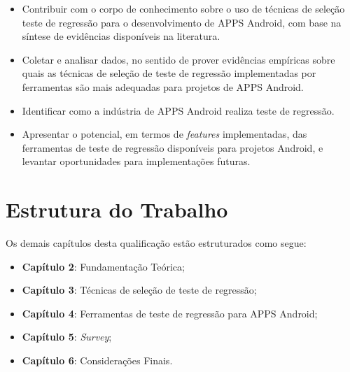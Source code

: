 \begin{itemize}

    \item Contribuir com o corpo de conhecimento sobre o uso de técnicas de seleção teste de regressão para o desenvolvimento de \ac{APPS} Android, com base na síntese de evidências disponíveis na literatura.
    
    \item Coletar e analisar dados, no sentido de prover evidências empíricas sobre quais as técnicas de seleção de teste de regressão implementadas por ferramentas são mais adequadas para projetos de \ac{APPS} Android.
    
    \item Identificar como a indústria de \ac{APPS} Android realiza teste de regressão.
    
    \item Apresentar o potencial, em termos de \textit{features} implementadas, das ferramentas de teste de regressão disponíveis para projetos Android, e levantar oportunidades para implementações futuras.

\end{itemize}


\section{Estrutura do Trabalho}\label{sec:estruturadotrabalho}

Os demais capítulos desta qualificação estão estruturados como segue: 
\begin{itemize}
\item \textbf{Capítulo 2}: Fundamentação Teórica;
\item \textbf{Capítulo 3}: Técnicas de seleção de teste de regressão;
\item \textbf{Capítulo 4}: Ferramentas de teste de regressão para \ac{APPS} Android;
\item \textbf{Capítulo 5}: \textit{Survey};
\item \textbf{Capítulo 6}: Considerações Finais.
\end{itemize}